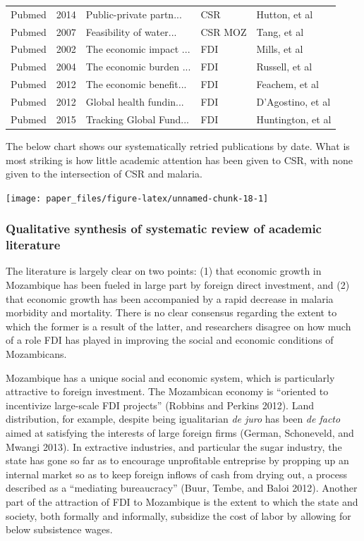 \documentclass[]{elsarticle} %
\begin{document}
\begin{longtable}{lllll}
  Pubmed & 2014 & Public-private partn... & CSR & Hutton, et al \\ 
  Pubmed & 2007 & Feasibility of water... & CSR MOZ & Tang, et al \\ 
  Pubmed & 2002 & The economic impact ... & FDI & Mills, et al \\ 
  Pubmed & 2004 & The economic burden ... & FDI & Russell, et al \\ 
  Pubmed & 2012 & The economic benefit... & FDI & Feachem, et al \\ 
  Pubmed & 2012 & Global health fundin... & FDI & D'Agostino, et al \\ 
  Pubmed & 2015 & Tracking Global Fund... & FDI & Huntington, et al \\ 
   \hline
\hline
\end{longtable}

\endgroup

The below chart shows our systematically retried publications by date.
What is most striking is how little academic attention has been given to
CSR, with none given to the intersection of CSR and malaria.

\begin{center}\texttt{[image: paper\_files/figure-latex/unnamed-chunk-18-1]} \end{center}

\subsubsection{Qualitative synthesis of systematic review of academic
literature}\label{qualitative-synthesis-of-systematic-review-of-academic-literature}

The literature is largely clear on two points: (1) that economic growth
in Mozambique has been fueled in large part by foreign direct
investment, and (2) that economic growth has been accompanied by a rapid
decrease in malaria morbidity and mortality. There is no clear consensus
regarding the extent to which the former is a result of the latter, and
researchers disagree on how much of a role FDI has played in improving
the social and economic conditions of Mozambicans.

Mozambique has a unique social and economic system, which is
particularly attractive to foreign investment. The Mozambican economy is
``oriented to incentivize large-scale FDI projects'' (Robbins and
Perkins 2012). Land distribution, for example, despite being
igualitarian \emph{de juro} has been \emph{de facto} aimed at satisfying
the interests of large foreign firms (German, Schoneveld, and Mwangi
2013). In extractive industries, and particular the sugar industry, the
state has gone so far as to encourage unprofitable entreprise by
propping up an internal market so as to keep foreign inflows of cash
from drying out, a process described as a ``mediating bureaucracy''
(Buur, Tembe, and Baloi 2012). Another part of the attraction of FDI to
Mozambique is the extent to which the state and society, both formally
and informally, subsidize the cost of labor by allowing for below
subsistence wages.
\end{document}
